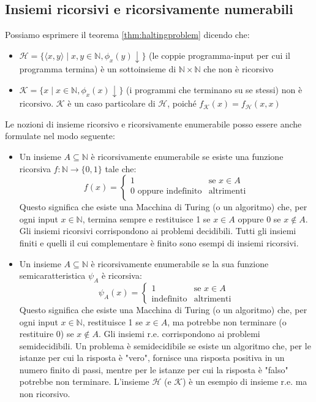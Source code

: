 \documentclass[12pt, a4paper]{report}
\begin{document}
                \subsection{Insiemi ricorsivi e ricorsivamente numerabili}
                    Possiamo esprimere il teorema \ref{thm:haltingproblem} dicendo che:
                    \begin{itemize}
                        \item $\mathcal{H}=\{\langle x,y\rangle\mid x,y\in\mathbb{N},\phi_x(y)\downarrow\}$ (le coppie programma-input per cui il programma termina) è un sottoinsieme di $\mathbb{N}\times\mathbb{N}$ che non è ricorsivo
                        \item $\mathcal{K}=\{x\mid x\in\mathbb{N},\phi_x(x)\downarrow\}$  (i programmi che terminano su se stessi) non è ricorsivo. $\mathcal{K}$ è un caso particolare di $\mathcal{H}$, poiché $f_\mathcal{K}(x) = f_\mathcal{H}(x, x)$
                    \end{itemize}
                    Le nozioni di insieme ricorsivo e ricorsivamente enumerabile posso essere anche formulate nel modo seguente:
                    \begin{itemize}
                        \item Un insieme $A\subseteq\mathbb{N}$ è ricorsivamente enumerabile se esiste una funzione ricorsiva $f:\mathbb{N}\to\{0,1\}$ tale che: $$f(x)=\begin{cases}
                            1 & \text{se }x\in A\\
                            0\text{ oppure indefinito} & \text{altrimenti}\\
                        \end{cases}$$ Questo significa che esiste una Macchina di Turing (o un algoritmo) che, per ogni input $x \in \mathbb{N}$, termina sempre e restituisce 1 se $x \in A$ oppure 0 se $x \notin A$. Gli insiemi ricorsivi corrispondono ai problemi decidibili. Tutti gli insiemi finiti e quelli il cui complementare è finito sono esempi di insiemi ricorsivi.
                        \item Un insieme $A\subseteq\mathbb{N}$ è ricorsivamente enumerabile se la sua funzione semicaratteristica $\psi_A$ è ricorsiva: $$\psi_A(x)=\begin{cases}
                            1 & \text{se } x\in A \\
                            \text{indefinito} & \text{altrimenti}
                        \end{cases}$$ Questo significa che esiste una Macchina di Turing (o un algoritmo) che, per ogni input $x \in \mathbb{N}$, restituisce 1 se $x \in A$, ma potrebbe non terminare (o restituire 0) se $x \notin A$. Gli insiemi r.e. corrispondono ai problemi semidecidibili. Un problema è semidecidibile se esiste un algoritmo che, per le istanze per cui la risposta è "vero", fornisce una risposta positiva in un numero finito di passi, mentre per le istanze per cui la risposta è "falso" potrebbe non terminare.  L'insieme $\mathcal{H}$ (e $\mathcal{K}$) è un esempio di insieme r.e. ma non ricorsivo.
                    \end{itemize}
\end{document}
